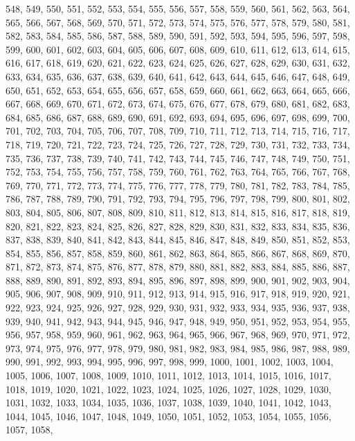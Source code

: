 \documentclass[a4paper,11pt]{article}
\numberwithin{equation}{section}
\begin{document}
548, 549, 550, 551, 552, 553, 554, 555, 556, 557, 558, 559, 560, 561, 562,
563, 564, 565, 566, 567, 568, 569, 570, 571, 572, 573, 574, 575, 576, 577,
578, 579, 580, 581, 582, 583, 584, 585, 586, 587, 588, 589, 590, 591, 592,
593, 594, 595, 596, 597, 598, 599, 600, 601, 602, 603, 604, 605, 606, 607,
608, 609, 610, 611, 612, 613, 614, 615, 616, 617, 618, 619, 620, 621, 622,
623, 624, 625, 626, 627, 628, 629, 630, 631, 632, 633, 634, 635, 636, 637,
638, 639, 640, 641, 642, 643, 644, 645, 646, 647, 648, 649, 650, 651, 652,
653, 654, 655, 656, 657, 658, 659, 660, 661, 662, 663, 664, 665, 666, 667,
668, 669, 670, 671, 672, 673, 674, 675, 676, 677, 678, 679, 680, 681, 682,
683, 684, 685, 686, 687, 688, 689, 690, 691, 692, 693, 694, 695, 696, 697,
698, 699, 700, 701, 702, 703, 704, 705, 706, 707, 708, 709, 710, 711, 712,
713, 714, 715, 716, 717, 718, 719, 720, 721, 722, 723, 724, 725, 726, 727,
728, 729, 730, 731, 732, 733, 734, 735, 736, 737, 738, 739, 740, 741, 742,
743, 744, 745, 746, 747, 748, 749, 750, 751, 752, 753, 754, 755, 756, 757,
758, 759, 760, 761, 762, 763, 764, 765, 766, 767, 768, 769, 770, 771, 772,
773, 774, 775, 776, 777, 778, 779, 780, 781, 782, 783, 784, 785, 786, 787,
788, 789, 790, 791, 792, 793, 794, 795, 796, 797, 798, 799, 800, 801, 802,
803, 804, 805, 806, 807, 808, 809, 810, 811, 812, 813, 814, 815, 816, 817,
818, 819, 820, 821, 822, 823, 824, 825, 826, 827, 828, 829, 830, 831, 832,
833, 834, 835, 836, 837, 838, 839, 840, 841, 842, 843, 844, 845, 846, 847,
848, 849, 850, 851, 852, 853, 854, 855, 856, 857, 858, 859, 860, 861, 862,
863, 864, 865, 866, 867, 868, 869, 870, 871, 872, 873, 874, 875, 876, 877,
878, 879, 880, 881, 882, 883, 884, 885, 886, 887, 888, 889, 890, 891, 892,
893, 894, 895, 896, 897, 898, 899, 900, 901, 902, 903, 904, 905, 906, 907,
908, 909, 910, 911, 912, 913, 914, 915, 916, 917, 918, 919, 920, 921, 922,
923, 924, 925, 926, 927, 928, 929, 930, 931, 932, 933, 934, 935, 936, 937,
938, 939, 940, 941, 942, 943, 944, 945, 946, 947, 948, 949, 950, 951, 952,
953, 954, 955, 956, 957, 958, 959, 960, 961, 962, 963, 964, 965, 966, 967,
968, 969, 970, 971, 972, 973, 974, 975, 976, 977, 978, 979, 980, 981, 982,
983, 984, 985, 986, 987, 988, 989, 990, 991, 992, 993, 994, 995, 996, 997,
998, 999, 1000, 1001, 1002, 1003, 1004, 1005, 1006, 1007, 1008, 1009, 1010,
1011, 1012, 1013, 1014, 1015, 1016, 1017, 1018, 1019, 1020, 1021, 1022,
1023, 1024, 1025, 1026, 1027, 1028, 1029, 1030, 1031, 1032, 1033, 1034,
1035, 1036, 1037, 1038, 1039, 1040, 1041, 1042, 1043, 1044, 1045, 1046,
1047, 1048, 1049, 1050, 1051, 1052, 1053, 1054, 1055, 1056, 1057, 1058,
\end{document}
